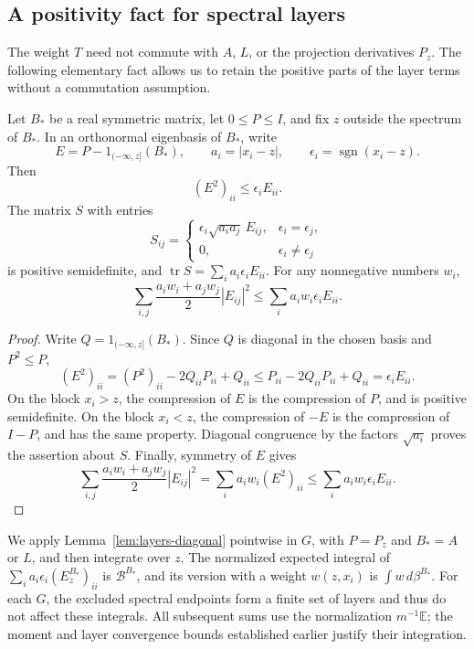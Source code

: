 \subsection{A positivity fact for spectral layers}

The weight \(T\) need not commute with \(A\), \(L\), or the
projection derivatives \(P_z\).  The following elementary fact
allows us to retain the positive parts of the layer terms without
a commutation assumption.

\begin{lemma}
\label{lem:layers-diagonal}
Let \(B_*\) be a real symmetric matrix, let \(0\le P\le I\), and
fix \(z\) outside the spectrum of \(B_*\).
In an orthonormal eigenbasis of \(B_*\), write
\[
 E=P-1_{(-\infty,z]}(B_*),\qquad
 a_i=|x_i-z|,\qquad \epsilon_i=\operatorname{sgn}(x_i-z).
\]
Then
\[
 (E^2)_{ii}\le\epsilon_iE_{ii}.
\]
The matrix \(S\) with entries
\[
 S_{ij}=
 \begin{cases}
  \epsilon_i\sqrt{a_i a_j}\,E_{ij},&\epsilon_i=\epsilon_j,\\
  0,&\epsilon_i\ne\epsilon_j
 \end{cases}
\]
is positive semidefinite, and
\(\operatorname{tr}S=\sum_i a_i\epsilon_iE_{ii}\).
For any nonnegative numbers \(w_i\),
\[
 \sum_{i,j}\frac{a_iw_i+a_jw_j}{2}|E_{ij}|^2
 \le\sum_i a_iw_i\epsilon_iE_{ii}.
\]
\end{lemma}

\begin{proof}
Write \(Q=1_{(-\infty,z]}(B_*)\).
Since \(Q\) is diagonal in the chosen basis and \(P^2\le P\),
\[
 (E^2)_{ii}=(P^2)_{ii}-2Q_{ii}P_{ii}+Q_{ii}
 \le P_{ii}-2Q_{ii}P_{ii}+Q_{ii}
 =\epsilon_iE_{ii}.
\]
On the block \(x_i>z\), the compression of \(E\) is the
compression of \(P\), and is positive semidefinite.
On the block \(x_i<z\), the compression of \(-E\) is the
compression of \(I-P\), and has the same property.
Diagonal congruence by the factors \(\sqrt{a_i}\) proves the
assertion about \(S\).
Finally, symmetry of \(E\) gives
\[
 \sum_{i,j}\frac{a_iw_i+a_jw_j}{2}|E_{ij}|^2
 =\sum_i a_iw_i(E^2)_{ii}
 \le\sum_i a_iw_i\epsilon_iE_{ii}.
\]
\end{proof}

We apply Lemma~\ref{lem:layers-diagonal} pointwise in \(G\), with \(P=P_z\) and
\(B_*=A\) or \(L\), and then integrate over \(z\).
The normalized expected integral of
\(\sum_i a_i\epsilon_i(E_z^{B_*})_{ii}\) is
\(\mathcal B^{B_*}\), and its version with a weight \(w(z,x_i)\)
is \(\int w\,d\beta^{B_*}\).
For each \(G\), the excluded spectral endpoints form a finite
set of layers and thus do not affect these integrals.
All subsequent sums use the normalization \(m^{-1}\mathbb E\);
the moment and layer convergence bounds established earlier
justify their integration.

